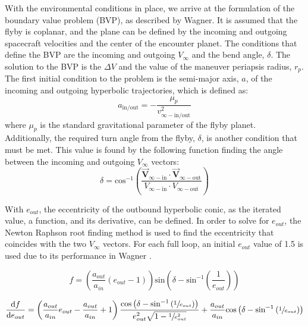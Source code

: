\documentclass[letterpaper, preprint, paper,11pt]{AAS}	%
\begin{document}
With the environmental conditions in place, we arrive at the formulation of the boundary value problem (BVP), as described by Wagner\cite{Wagner2015}. It is assumed that the flyby is coplanar, and the plane can be defined by the incoming and outgoing spacecraft velocities and the center of the encounter planet. The conditions that define the BVP are the incoming and outgoing $V_\infty$ and the bend angle, $\delta$. The solution to the BVP is the $\Delta V$ and the value of the maneuver periapsis radius, $r_p$. The first initial condition to the problem is the semi-major axis, $a$, of the incoming and outgoing hyperbolic trajectories, which is defined as:
\begin{equation}
    a_\text{in/out} = -\frac{\mu_p}{v^2_{\infty-\text{in/out}}}
\end{equation}
\noindent where $\mu_p$ is the standard gravitational parameter of the flyby planet. Additionally, the required turn angle from the flyby, $\delta$, is another condition that must be met. This value is found by the following function finding the angle between the incoming and outgoing $V_\infty$ vectors:
\begin{equation}
    \delta = \text{cos}^{-1}\left(\frac{ \vec{\textbf{V}}_{\infty-\text{in}} \cdot \vec{\textbf{V}}_{\infty-\text{out}} }{ V_{\infty-\text{in}} \cdot V_{\infty-\text{out}} }\right)
\end{equation}

With $e_{out}$, the eccentricity of the outbound hyperbolic conic, as the iterated value, a function, and its derivative, can be defined. In order to solve for $e_{out}$, the Newton Raphson root finding method is used to find the eccentricity that coincides with the two $V_\infty$ vectors. For each full loop, an initial $e_{out}$ value of 1.5 is used due to its performance in Wagner \cite{Wagner2015}.

\begin{equation}
    f = \left( \frac{a_{out}}{a_{in}} (e_{out} - 1) \right) \text{sin} \left( \delta - \text{sin}^{-1} \left( \frac{1}{e_{out}} \right) \right)
\end{equation}

\begin{equation}
    \frac{\text{d}f}{\text{d}e_{out}} = \left( \frac{a_{out}}{a_{in}}e_{out} - \frac{a_{out}}{a_{in}} + 1 \right) \frac{ \text{cos}\left( \delta - \text{sin}^{-1} \left( \sfrac{1}{e_{out}} \right) \right) }{ e_{out}^{2} \sqrt{1 - \sfrac{1}{e_{out}^{2}} } } + \frac{a_{out}}{a_{in}}\text{cos}\left( \delta - \text{sin}^{-1} \left( \sfrac{1}{e_{out}} \right) \right)
\end{equation}
\end{document}
